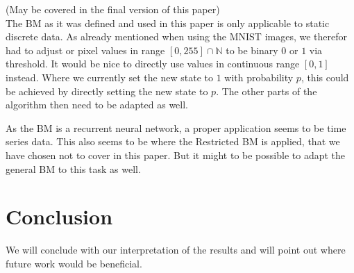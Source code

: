 \documentclass[12pt,twoside]{article}
\theoremstyle{plain}
\theoremstyle{definition}
\theoremstyle{remark}
\begin{document}
(May be covered in the final version of this paper)\\

\noindent
The BM as it was defined and used in this paper is only applicable to static discrete data. As already mentioned when using the MNIST images, we therefor had to adjust or pixel values in range $[0,255]\cap\mathbb{N}$ to be binary $0$ or $1$ via threshold. It would be nice to directly use values in continuous range $[0,1]$ instead. Where we currently set the new state to $1$ with probability $p$, this could be achieved by directly setting the new state to $p$. The other parts of the algorithm then need to be adapted as well.

As the BM is a recurrent neural network, a proper application seems to be time series data. This also seems to be where the Restricted BM is applied, that we have chosen not to cover in this paper. But it might to be possible to adapt the general BM to this task as well.


\section{Conclusion}
\label{sec:concl}

We will conclude with our interpretation of the results and will point out where future work would be beneficial.


%
%
\newpage


\end{document}
